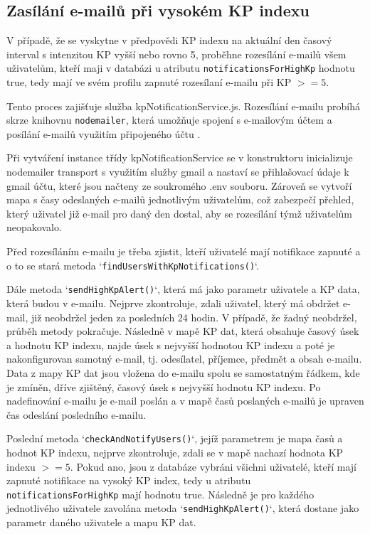 \subsection{Zasílání e-mailů při vysokém KP indexu}

\par V případě, že se vyskytne v předpovědi KP indexu na aktuální den časový interval s intenzitou KP vyšší nebo rovno 5, proběhne rozesílání e-mailů všem uživatelům, kteří maji v databázi u atributu \texttt{notificationsForHighKp} hodnotu true, tedy mají ve svém profilu zapnuté rozesílaní e-mailu při KP $>= 5$.
\par Tento proces zajišťuje služba kpNotificationService.js. Rozesílání e-mailu probíhá skrze knihovnu \texttt{nodemailer}, která umožňuje spojení s e-mailovým účtem a posílání e-mailů využitím připojeného účtu \cite{mailtrap_nodemailer} \cite{nodejs_nodemailer_tutorial}.
\par Při vytváření instance třídy kpNotificationService se v konstruktoru inicializuje nodemailer transport s využitím služby gmail a nastaví se přihlašovací údaje k gmail účtu, které jsou načteny ze soukromého .env souboru. Zároveň se vytvoří mapa s časy odeslaných e-mailů jednotlivým uživatelům, což zabezpečí přehled, který uživatel již e-mail pro daný den dostal, aby se rozesílání týmž uživatelům neopakovalo.
\par Před rozesíláním e-mailu je třeba zjistit, kteří uživatelé mají notifikace zapnuté a o to se stará metoda `\texttt{findUsersWithKpNotifications()}`.
\par Dále metoda `\texttt{sendHighKpAlert()}`, která má jako parametr uživatele a KP data, která budou v e-mailu. Nejprve zkontroluje, zdali uživatel, který má obdržet e-mail, již neobdržel jeden za posledních 24 hodin. V případě, že žadný neobdržel, průběh metody pokračuje. Následně v mapě KP dat, která obsahuje časový úsek a hodnotu KP indexu, najde úsek s nejvyšší hodnotou KP indexu a poté je nakonfigurovan samotný e-mail, tj. odesílatel, příjemce, předmět a obsah e-mailu. Data z mapy KP dat jsou vložena do e-mailu spolu se samostatným řádkem, kde je zmíněn, dříve zjištěný, časový úsek s nejvyšší hodnotu KP indexu. Po nadefinování e-mailu je e-mail poslán a v mapě časů poslaných e-mailů je upraven čas odeslání posledního e-mailu.
\par Poslední metoda `\texttt{checkAndNotifyUsers()}`, jejíž parametrem je mapa časů a hodnot KP indexu, nejprve zkontroluje, zdali se v mapě nachazí hodnota KP indexu $>=5$. Pokud ano, jsou z databáze vybráni všichni uživatelé, kteří mají zapnuté notifikace na vysoký KP index, tedy u atributu \texttt{notificationsForHighKp} mají hodnotu true. Následně je pro každého jednotlivého uživatele zavolána metoda `\texttt{sendHighKpAlert()}`, která dostane jako parametr daného uživatele a mapu KP dat.
